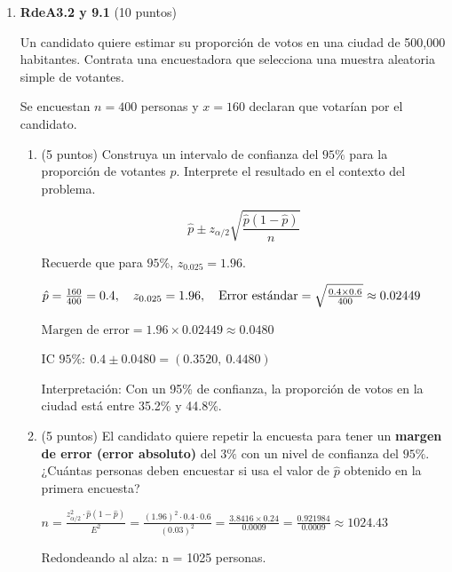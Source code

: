 \documentclass[10pt,a4paper]{article}
\begin{document}
\begin{enumerate}
{\begin{enumerate}
        \end{enumerate}
        
    }
    
   

    

     \item \textbf{RdeA3.2 y 9.1} (10 puntos)

Un candidato quiere estimar su proporción  de votos en una ciudad de 500,000 habitantes. Contrata una encuestadora que selecciona una muestra aleatoria simple de votantes.
  
    Se encuestan $n = 400$ personas y $x = 160$ declaran que votarían por el candidato.
    
    \begin{enumerate}
        \item  (5 puntos) Construya un intervalo de confianza del $95\%$ para la proporción de votantes $p$. Interprete el resultado en el contexto del problema.
        
        \[
        \hat{p} \pm z_{\alpha/2} \sqrt{\frac{\hat{p}(1-\hat{p})}{n}}
        \]
        
        Recuerde que para $95\%$, $z_{0.025} = 1.96$.

        {\color{blue}  $\hat{p} = {160 \over 400} = 0.4,\quad z_{0.025}=1.96,\quad \text{Error estándar} = \sqrt{\frac{0.4\times0.6}{400}} \approx 0.02449$ 
        
        $\text{Margen de error} = 1.96\times0.02449 \approx 0.0480$

$\text{IC }95\%:\ 0.4 \pm 0.0480 = (0.3520,\ 0.4480)$

{Interpretación: Con un 95\% de confianza, la proporción  de votos en la ciudad está entre 35.2\% y 44.8\%.}}
    
    \item (5 puntos) El candidato quiere repetir la encuesta para tener un \textbf{margen de error (error absoluto)} del $3\%$ con un nivel de confianza del $95\%$. ¿Cuántas personas deben encuestar si usa el valor de $\hat{p}$ obtenido en la primera encuesta?

    {\color{blue} $n = \frac{z_{\alpha/2}^2 \cdot \hat{p}(1-\hat{p})}{E^2} = \frac{(1.96)^2 \cdot 0.4 \cdot 0.6}{(0.03)^2} = \frac{3.8416 \times 0.24}{0.0009} = \frac{0.921984}{0.0009} \approx 1024.43$

{Redondeando al alza: } n = 1025 { personas.}}
    \end{enumerate}
    



\end{enumerate}
\end{document}
